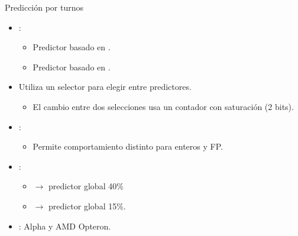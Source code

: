 \begin{frame}[t]{Predicción por turnos}
\begin{itemize}
  \item {}:
    \begin{itemize}
      \item Predictor basado en .
      \item Predictor basado en .
    \end{itemize}
  \item Utiliza un selector para elegir entre predictores.
    \begin{itemize}
      \item El cambio entre dos selecciones usa un contador con saturación (2 bits).
    \end{itemize}
  \item {}:
    \begin{itemize}
      \item Permite comportamiento distinto para enteros y FP.
    \end{itemize}
  \item {}:
    \begin{itemize}
      \item {} $\rightarrow$ predictor global 40\%
      \item {} $\rightarrow$ predictor global 15\%.
    \end{itemize}
  \item {}: Alpha y AMD Opteron.
\end{itemize}
\end{frame}


